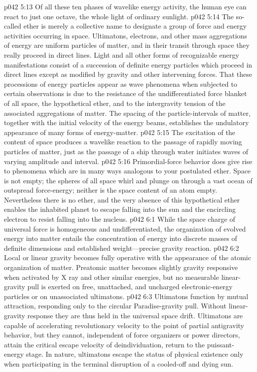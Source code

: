 \pc \vs p042 5:13 Of all these ten phases of wavelike energy activity, the human eye can react to just one octave, the whole light of ordinary sunlight.
\pc \vs p042 5:14 The so\hyp{}called ether is merely a collective name to designate a group of force and energy activities occurring in space. Ultimatons, electrons, and other mass aggregations of energy are uniform particles of matter, and in their transit through space they really proceed in direct lines. Light and all other forms of recognizable energy manifestations consist of a succession of definite energy particles which proceed in direct lines except as modified by gravity and other intervening forces. That these processions of energy particles appear as wave phenomena when subjected to certain observations is due to the resistance of the undifferentiated force blanket of all space, the hypothetical ether, and to the intergravity tension of the associated aggregations of matter. The spacing of the particle\hyp{}intervals of matter, together with the initial velocity of the energy beams, establishes the undulatory appearance of many forms of energy\hyp{}matter.
\vs p042 5:15 The excitation of the content of space produces a wavelike reaction to the passage of rapidly moving particles of matter, just as the passage of a ship through water initiates waves of varying amplitude and interval.
\vs p042 5:16 Primordial\hyp{}force behavior does give rise to phenomena which are in many ways analogous to your postulated ether. Space is not empty; the spheres of all space whirl and plunge on through a vast ocean of outspread force\hyp{}energy; neither is the space content of an atom empty. Nevertheless there is no ether, and the very absence of this hypothetical ether enables the inhabited planet to escape falling into the sun and the encircling electron to resist falling into the nucleus.
\vs p042 6:1 While the space charge of universal force is homogeneous and undifferentiated, the organization of evolved energy into matter entails the concentration of energy into discrete masses of definite dimensions and established weight---precise gravity reaction.
\vs p042 6:2 Local or linear gravity becomes fully operative with the appearance of the atomic organization of matter. Preatomic matter becomes slightly gravity responsive when activated by X ray and other similar energies, but no measurable linear\hyp{}gravity pull is exerted on free, unattached, and uncharged electronic\hyp{}energy particles or on unassociated ultimatons.
\pc \vs p042 6:3 Ultimatons function by mutual attraction, responding only to the circular Paradise\hyp{}gravity pull. Without linear\hyp{}gravity response they are thus held in the universal space drift. Ultimatons are capable of accelerating revolutionary velocity to the point of partial antigravity behavior, but they cannot, independent of force organizers or power directors, attain the critical escape velocity of deindividuation, return to the puissant\hyp{}energy stage. In nature, ultimatons escape the status of physical existence only when participating in the terminal disruption of a cooled\hyp{}off and dying sun.
